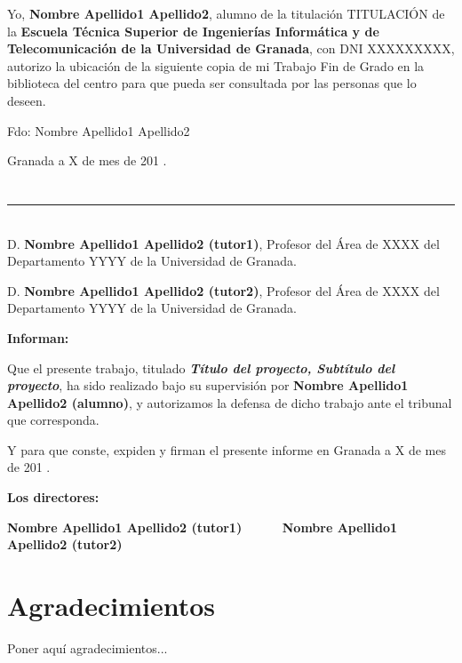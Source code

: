 Yo, \textbf{Nombre Apellido1 Apellido2}, alumno de la titulación TITULACIÓN de la \textbf{Escuela Técnica Superior
de Ingenierías Informática y de Telecomunicación de la Universidad de Granada}, con DNI XXXXXXXXX, autorizo la
ubicación de la siguiente copia de mi Trabajo Fin de Grado en la biblioteca del centro para que pueda ser
consultada por las personas que lo deseen.

\vspace{6cm}

\noindent Fdo: Nombre Apellido1 Apellido2

\vspace{2cm}

\begin{flushright}
Granada a X de mes de 201 .
\end{flushright}


\chapter*{}
\thispagestyle{empty}

\noindent\rule[-1ex]{\textwidth}{2pt}\\[4.5ex]

D. \textbf{Nombre Apellido1 Apellido2 (tutor1)}, Profesor del Área de XXXX del Departamento YYYY de la Universidad de Granada.

\vspace{0.5cm}

D. \textbf{Nombre Apellido1 Apellido2 (tutor2)}, Profesor del Área de XXXX del Departamento YYYY de la Universidad de Granada.


\vspace{0.5cm}

\textbf{Informan:}

\vspace{0.5cm}

Que el presente trabajo, titulado \textit{\textbf{Título del proyecto, Subtítulo del proyecto}},
ha sido realizado bajo su supervisión por \textbf{Nombre Apellido1 Apellido2 (alumno)}, y autorizamos la defensa de dicho trabajo ante el tribunal
que corresponda.

\vspace{0.5cm}

Y para que conste, expiden y firman el presente informe en Granada a X de mes de 201 .

\vspace{1cm}

\textbf{Los directores:}

\vspace{5cm}

\noindent \textbf{Nombre Apellido1 Apellido2 (tutor1) \ \ \ \ \ Nombre Apellido1 Apellido2 (tutor2)}

\chapter*{Agradecimientos}
\thispagestyle{empty}

       \vspace{1cm}


Poner aquí agradecimientos...

